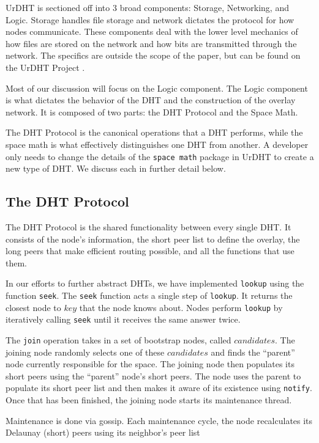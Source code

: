 \documentclass[11pt,conference]{IEEEtran}
\begin{document}
UrDHT is sectioned off into 3 broad components: Storage, Networking, and Logic.
Storage handles file storage and network dictates the protocol for how nodes communicate.
These components deal with the lower level mechanics of how files are stored on the network and how bits are transmitted through the network.
The specifics are outside the scope of the paper, but can be found on the UrDHT Project \cite{urdht}.

Most of our discussion will focus on the Logic component.
The Logic component is what dictates the behavior of the DHT and the construction of the overlay network.
It is composed of two parts: the DHT Protocol and the Space Math.

The DHT Protocol is the canonical operations that a DHT performs, while the space math is what effectively distinguishes one DHT from another.
A developer only needs to change the details of the \texttt{space math} package in UrDHT to create a new type of DHT.
We discuss each in further detail below.

\subsection{The DHT Protocol }
\label{sec:protocol}

The DHT Protocol is the shared functionality between every single DHT.
It consists of the node's information, the short peer list to define the overlay, the long peers that make efficient routing possible, and all the functions that use them.




In our efforts to further abstract DHTs, we have implemented \texttt{lookup} using the function \texttt{seek}.
The \texttt{seek} function acts a single step of \texttt{lookup}.
It returns the closest node to $ key $ that the node knows about.
Nodes perform \texttt{lookup} by iteratively calling \texttt{seek} until it receives the same answer twice.


The \texttt{join} operation takes in a set of bootstrap nodes, called $ candidates $.
The joining node randomly selects one of these $ candidates $ and finds the ``parent'' node currently responsible for the space.
The joining node then populates its short peers using the ``parent'' node's short peers.
The node  uses the parent to populate its short peer list and then makes it aware of its existence using \texttt{notify}.
Once that has been finished, the joining node starts its maintenance thread.


Maintenance is done via gossip.
Each maintenance cycle, the node recalculates its Delaunay (short) peers using its neighbor's peer list 
\end{document}

